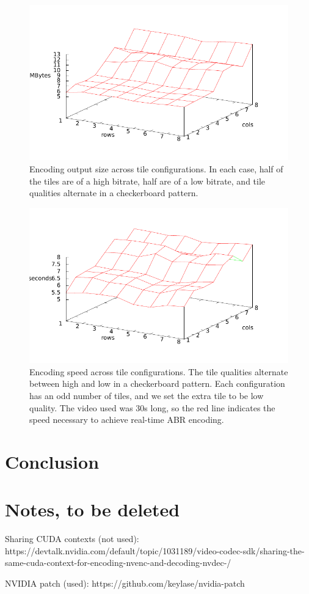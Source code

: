 \begin{figure}[t]
	\includegraphics[width=\columnwidth]{figures/Sizes.pdf}
	\caption{Encoding output size across tile configurations. In each case, half of the tiles are of a high bitrate, half are of a low bitrate, and tile qualities alternate in a checkerboard pattern.}
\end{figure}

\begin{figure}[t]
	\includegraphics[width=\columnwidth]{figures/Times.pdf}
	\caption{Encoding speed across tile configurations. The tile qualities alternate between high and low in a checkerboard pattern. Each configuration has an odd number of tiles, and we set the extra tile to be low quality. The video used was 30s long, so the red line indicates the speed necessary to achieve real-time ABR encoding.}
\end{figure}


\section{Conclusion}

\section{Notes, to be deleted}
Sharing CUDA contexts (not used): https://devtalk.nvidia.com/default/topic/1031189/video-codec-sdk/sharing-the-same-cuda-context-for-encoding-nvenc-and-decoding-nvdec-/

NVIDIA patch (used): https://github.com/keylase/nvidia-patch
